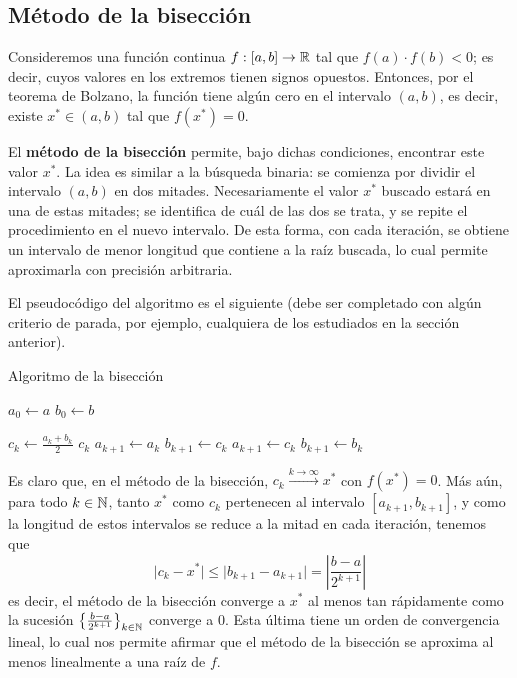 \subsection{Método de la bisección}

Consideremos una función continua $f : [a,b] \to \mathbb{R}$ tal que $f(a) \cdot
f(b) < 0$; es decir, cuyos valores en los extremos tienen signos opuestos.
Entonces, por el teorema de Bolzano, la función tiene algún cero en el
intervalo $(a,b)$, es decir, existe $x^\ast \in (a,b)$ tal que $f(x^\ast) = 0$.

El \textbf{método de la bisección} permite, bajo dichas condiciones,
encontrar este valor $x^\ast$. La idea es similar a la búsqueda binaria: se
comienza por dividir el intervalo $(a,b)$ en dos mitades. Necesariamente
el valor $x^\ast$ buscado estará en una de estas mitades; se identifica de cuál
de las dos se trata, y se repite el procedimiento en el nuevo intervalo.
De esta forma, con cada iteración, se obtiene un intervalo de menor longitud
que contiene a la raíz buscada, lo cual permite aproximarla con precisión
arbitraria.

El pseudocódigo del algoritmo es el siguiente (debe ser completado con algún
criterio de parada, por ejemplo, cualquiera de los estudiados en la sección
anterior).

\begin{algorithm}[H]
\caption{Algoritmo de la bisección}
\label{algo:biseccion}


$a_0 \gets a$ \;
$b_0 \gets b$ \;

 {
    $c_k \gets \frac{a_k + b_k}{2}$ \;
     {
        \Return $c_k$ \;
    }
     {
        $a_{k+1} \gets a_k$ \;
        $b_{k+1} \gets c_k$ \;
    }
    {
        $a_{k+1} \gets c_k$ \;
        $b_{k+1} \gets b_k$ \;
    }
}

\end{algorithm}

Es claro que, en el método de la bisección, $c_k \xrightarrow{k \to \infty}
x^\ast$ con $f(x^\ast) = 0$. Más aún, para todo $k \in \mathbb{N}$, tanto $x^\ast$
como $c_k$ pertenecen al intervalo $[a_{k+1}, b_{k+1}]$, y como la longitud de
estos intervalos se reduce a la mitad en cada iteración, tenemos que
\[ \lvert c_k - x^\ast \rvert \leq \lvert b_{k+1} - a_{k+1} \rvert =
    \left\lvert \frac{b - a}{2^{k+1}} \right\rvert \]
es decir, el método de la bisección converge a $x^\ast$ al menos tan
rápidamente como la sucesión $\left\lbrace \frac{b - a}{2^{k+1}}
\right\rbrace_{k \in \mathbb{N}}$ converge a $0$. Esta última tiene un
orden de convergencia lineal, lo cual nos permite afirmar que el método de la
bisección se aproxima al menos linealmente a una raíz de $f$.

